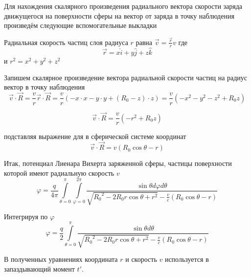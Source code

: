 \documentclass[12pt]{article}
\begin{document}
Для нахождения скалярного произведения радиального вектора скорости заряда движущегося на поверхности сферы на вектор от заряда в точку наблюдения произведём следующие вспомогательные выкладки

Радиальная скорость частиц слоя радиуса $r$ равна $\overrightarrow{v}=\frac{\overrightarrow{r}}{r}v$ где \[\overrightarrow{r}=x\widehat{i}+y\widehat{j}+z\widehat{k}\] и ${{r}^{2}}={{x}^{2}}+{{y}^{2}}+{{z}^{2}}$ 

Запишем скалярное произведение вектора радиальной скорости частиц на радиус вектор в точку наблюдения
$$\overrightarrow{v}\cdot \overrightarrow{R}=\frac{v}{r}\overrightarrow{r}\cdot \overrightarrow{R}=\frac{v}{r}\left( -x\cdot x-y\cdot y+\left( {{R}_{0}}-z \right)\cdot z \right)=\frac{v}{r}\left( -{{x}^{2}}-{{y}^{2}}-{{z}^{2}}+{{R}_{0}}z \right)$$

$$\overrightarrow{v}\cdot \overrightarrow{R}=\frac{v}{r}\left( -{{r}^{2}}+{{R}_{0}}z \right)$$

подставляя выражение для в сферической системе координат
	$$\overrightarrow{v}\cdot \overrightarrow{R}=v\left( {{R}_{0}}\cos \theta -r \right)$$

Итак, потенциал Лиенара Вихерта заряженной сферы, частицы поверхности которой имеют радиальную скорость $v$ 
	\[\varphi =\frac{q}{4\pi }\int\limits_{\theta =0}^{\pi }{\int\limits_{\varphi =0}^{2\pi }{\frac{\sin \theta d\varphi d\theta }{\sqrt{{{R}_{0}}^{2}-2{{R}_{0}}r\cos \theta +{{r}^{2}}}-\frac{v}{c}\left( {{R}_{0}}\cos \theta -r \right)}}}\] 	

Интегрируя по $\varphi $ 
	\[\varphi =\frac{q}{2}\int\limits_{\theta =0}^{\pi }{\frac{\sin \theta d\theta }{\sqrt{{{R}_{0}}^{2}-2{{R}_{0}}r\cos \theta +{{r}^{2}}}-\frac{v}{c}\left( {{R}_{0}}\cos \theta -r \right)}}\]

В полученных уравнениях координата $r$ и скорость $v$ используется в запаздывающий момент $t'$.



\end{document}
